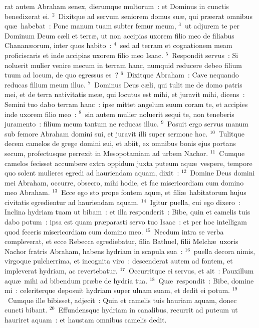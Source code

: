 \bchapter
{}rat autem Abraham senex, dierumque multorum~: et Dominus in cunctis benedixerat ei.
${}^{2}$~Dixitque ad servum seniorem domus su\ae , qui pr\ae erat omnibus qu\ae\ habebat~: Pone manum tuam subter femur meum,
${}^{3}$~ut adjurem te per Dominum Deum c\ae li et terr\ae , ut non accipias uxorem filio meo de filiabus Chanan\ae orum, inter quos habito~:
${}^{4}$~sed ad terram et cognationem meam proficiscaris et inde accipias uxorem filio meo Isaac.
${}^{5}$~Respondit servus~: Si noluerit mulier venire mecum in terram hanc, numquid reducere debeo filium tuum ad locum, de quo egressus es~?
${}^{6}$~Dixitque Abraham~: Cave nequando reducas filium meum illuc.
${}^{7}$~Dominus Deus c\ae li, qui tulit me de domo patris mei, et de terra nativitatis me\ae , qui locutus est mihi, et juravit mihi, dicens~: Semini tuo dabo terram hanc~: ipse mittet angelum suum coram te, et accipies inde uxorem filio meo~:
${}^{8}$~sin autem mulier noluerit sequi te, non teneberis juramento~: filium meum tantum ne reducas illuc.
${}^{9}$~Posuit ergo servus manum sub femore Abraham domini sui, et juravit illi super sermone hoc.
${}^{10}$~Tulitque decem camelos de grege domini sui, et abiit, ex omnibus bonis ejus portans secum, profectusque perrexit in Mesopotamiam ad urbem Nachor.
${}^{11}$~Cumque camelos fecisset accumbere extra oppidum juxta puteum aqu\ae\ vespere, tempore quo solent mulieres egredi ad hauriendam aquam, dixit~:
${}^{12}$~Domine Deus domini mei Abraham, occurre, obsecro, mihi hodie, et fac misericordiam cum domino meo Abraham.
${}^{13}$~Ecce ego sto prope fontem aqu\ae , et fili\ae\ habitatorum hujus civitatis egredientur ad hauriendam aquam.
${}^{14}$~Igitur puella, cui ego dixero~: Inclina hydriam tuam ut bibam~: et illa responderit~: Bibe, quin et camelis tuis dabo potum~: ipsa est quam pr\ae parasti servo tuo Isaac~: et per hoc intelligam quod feceris misericordiam cum domino meo.
${}^{15}$~Necdum intra se verba compleverat, et ecce Rebecca egrediebatur, filia Bathuel, filii Melch\ae\ uxoris Nachor fratris Abraham, habens hydriam in scapula sua~:
${}^{16}$~puella decora nimis, virgoque pulcherrima, et incognita viro~: descenderat autem ad fontem, et impleverat hydriam, ac revertebatur.
${}^{17}$~Occurritque ei servus, et ait~: Pauxillum aqu\ae\ mihi ad bibendum pr\ae be de hydria tua.
${}^{18}$~Qu\ae\ respondit~: Bibe, domine mi~: celeriterque deposuit hydriam super ulnam suam, et dedit ei potum.
${}^{19}$~Cumque ille bibisset, adjecit~: Quin et camelis tuis hauriam aquam, donec cuncti bibant.
${}^{20}$~Effundensque hydriam in canalibus, recurrit ad puteum ut hauriret aquam~: et haustam omnibus camelis dedit.
